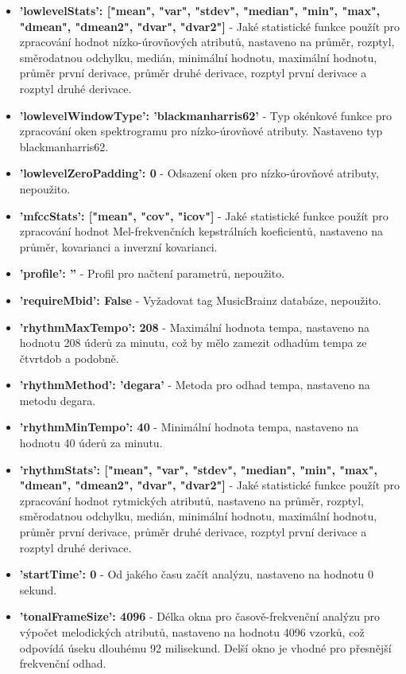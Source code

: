\begin{itemize}
    \item \textbf{'lowlevelStats': ["mean", "var", "stdev", "median", "min", "max", "dmean", "dmean2", "dvar", "dvar2"]} - Jaké statistické funkce použít pro zpracování hodnot nízko-úrovňových atributů, nastaveno na průměr, rozptyl, směrodatnou odchylku, medián, minimální hodnotu, maximální hodnotu, průměr první derivace, průměr druhé derivace, rozptyl první derivace a rozptyl druhé derivace.
    \item \textbf{'lowlevelWindowType': 'blackmanharris62'} - Typ okénkové funkce pro zpracování oken spektrogramu pro nízko-úrovňové atributy. Nastaveno typ blackmanharris62.
    \item \textbf{'lowlevelZeroPadding': 0} - Odsazení oken pro nízko-úrovňové atributy, nepoužito.
    \item \textbf{'mfccStats': ["mean", "cov", "icov"]} - Jaké statistické funkce použít pro zpracování hodnot Mel-frekvenčních kepstrálních koeficientů, nastaveno na průměr, kovarianci a inverzní kovarianci.
    \item \textbf{'profile': ''} - Profil pro načtení parametrů, nepoužito.
    \item \textbf{'requireMbid': False} - Vyžadovat tag MusicBrainz databáze, nepoužito.
    \item \textbf{'rhythmMaxTempo': 208} - Maximální hodnota tempa, nastaveno na hodnotu 208 úderů za minutu, což by mělo zamezit odhadům tempa ze čtvrtdob a podobně.
    \item \textbf{'rhythmMethod': 'degara'} - Metoda pro odhad tempa, nastaveno na metodu degara.
    \item \textbf{'rhythmMinTempo': 40} - Minimální hodnota tempa, nastaveno na hodnotu 40 úderů za minutu.
    \item \textbf{'rhythmStats': ["mean", "var", "stdev", "median", "min", "max", "dmean", "dmean2", "dvar", "dvar2"]} - Jaké statistické funkce použít pro zpracování hodnot rytmických atributů, nastaveno na průměr, rozptyl, směrodatnou odchylku, medián, minimální hodnotu, maximální hodnotu, průměr první derivace, průměr druhé derivace, rozptyl první derivace a rozptyl druhé derivace.
    \item \textbf{'startTime': 0} - Od jakého času začít analýzu, nastaveno na hodnotu 0 sekund.
    \item \textbf{'tonalFrameSize': 4096} - Délka okna pro časově-frekvenční analýzu pro výpočet melodických atributů, nastaveno na hodnotu 4096 vzorků, což odpovídá úseku dlouhému 92 milisekund. Delší okno je vhodné pro přesnější frekvenční odhad.

\end{itemize}
